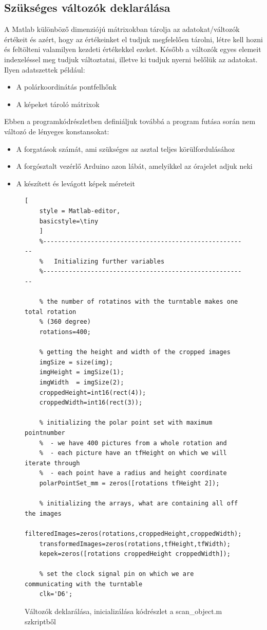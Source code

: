 \documentclass[12pt,a4paper]{article}
\begin{document}
\subsection{Szükséges változók deklarálása}
A Matlab különböző dimenziójú mátrixokban tárolja az adatokat/változók értékeit és azért, hogy az értékeinket el tudjuk megfelelően tárolni, létre kell hozni és feltölteni valamilyen kezdeti értékekkel ezeket. Később a változók egyes elemeit indexeléssel meg tudjuk változtatni, illetve ki tudjuk nyerni belőlük az adatokat. Ilyen adatszettek például:
\begin{itemize}
	\item A polárkoordinátás pontfelhőnk
	\item A képeket tároló mátrixok
\end{itemize}
Ebben a programkódrészletben definiáljuk továbbá a program futása során nem változó de lényeges konstansokat:
\begin{itemize}
	\item A forgatások számát, ami szükséges az asztal teljes körülfordulásához
	\item A forgósztalt vezérlő Arduino azon lábát, amelyikkel az órajelet adjuk neki
	\item A készített és levágott képek méreteit
\end{itemize}
\begin{figure}[h!]
	\centering
	\begin{lstlisting}[
	style = Matlab-editor,
	basicstyle=\tiny
	]
	%--------------------------------------------------------
	%   Initializing further variables
	%--------------------------------------------------------
	
	% the number of rotatinos with the turntable makes one total rotation 
	% (360 degree)
	rotations=400;
	
	% getting the height and width of the cropped images
	imgSize = size(img);
	imgHeight = imgSize(1);
	imgWidth  = imgSize(2);
	croppedHeight=int16(rect(4));
	croppedWidth=int16(rect(3));
	
	% initializing the polar point set with maximum pointnumber
	%  - we have 400 pictures from a whole rotation and 
	%  - each picture have an tfHeight on which we will iterate through
	%  - each point have a radius and height coordinate
	polarPointSet_mm = zeros([rotations tfHeight 2]);
	
	% initializing the arrays, what are containing all off the images
	filteredImages=zeros(rotations,croppedHeight,croppedWidth);
	transformedImages=zeros(rotations,tfHeight,tfWidth);
	kepek=zeros([rotations croppedHeight croppedWidth]);
	
	% set the clock signal pin on which we are communicating with the turntable
	clk='D6';
	\end{lstlisting}
	\caption{Változók deklarálása, inicializálása kódrészlet a scan\_object.m szkriptből}
\end{figure}
\end{document}
